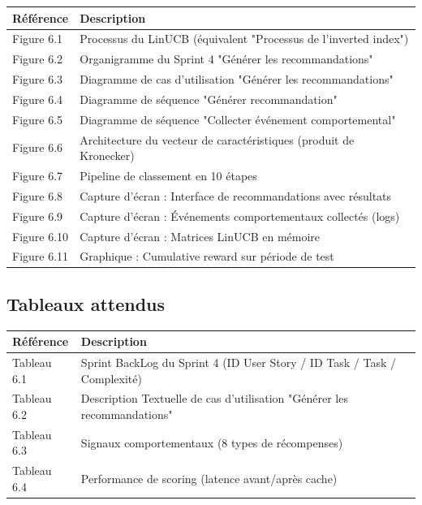 \documentclass[12pt,a4paper]{article}
\begin{document}
\begin{longtable}{p{2cm} p{12cm}}
    \textbf{Référence} & \textbf{Description} \\
    \midrule
    \endhead
    
    Figure 6.1 & Processus du LinUCB (équivalent "Processus de l'inverted index") \\
    Figure 6.2 & Organigramme du Sprint 4 "Générer les recommandations" \\
    Figure 6.3 & Diagramme de cas d'utilisation "Générer les recommandations" \\
    Figure 6.4 & Diagramme de séquence "Générer recommandation" \\
    Figure 6.5 & Diagramme de séquence "Collecter événement comportemental" \\
    Figure 6.6 & Architecture du vecteur de caractéristiques (produit de Kronecker) \\
    Figure 6.7 & Pipeline de classement en 10 étapes \\
    Figure 6.8 & Capture d'écran : Interface de recommandations avec résultats \\
    Figure 6.9 & Capture d'écran : Événements comportementaux collectés (logs) \\
    Figure 6.10 & Capture d'écran : Matrices LinUCB en mémoire \\
    Figure 6.11 & Graphique : Cumulative reward sur période de test \\
    \bottomrule
\end{longtable}

\subsection*{Tableaux attendus}

\begin{longtable}{p{2cm} p{12cm}}
    \textbf{Référence} & \textbf{Description} \\
    \midrule
    \endhead
    
    Tableau 6.1 & Sprint BackLog du Sprint 4 (ID User Story / ID Task / Task / Complexité) \\
    Tableau 6.2 & Description Textuelle de cas d'utilisation "Générer les recommandations" \\
    Tableau 6.3 & Signaux comportementaux (8 types de récompenses) \\
    Tableau 6.4 & Performance de scoring (latence avant/après cache) \\
    \bottomrule
\end{longtable}
\end{document}
